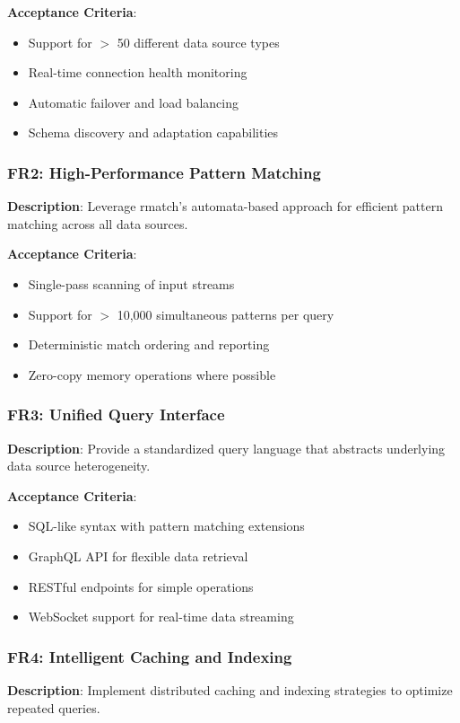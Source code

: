 \documentclass[11pt,a4paper]{article}
\begin{document}
\textbf{Acceptance Criteria}:
\begin{itemize}
\item Support for $>$ 50 different data source types
\item Real-time connection health monitoring
\item Automatic failover and load balancing
\item Schema discovery and adaptation capabilities
\end{itemize}

\subsubsection{FR2: High-Performance Pattern Matching}
\textbf{Description}: Leverage rmatch's automata-based approach for efficient pattern matching across all data sources.

\textbf{Acceptance Criteria}:
\begin{itemize}
\item Single-pass scanning of input streams
\item Support for $>$ 10,000 simultaneous patterns per query
\item Deterministic match ordering and reporting
\item Zero-copy memory operations where possible
\end{itemize}

\subsubsection{FR3: Unified Query Interface}
\textbf{Description}: Provide a standardized query language that abstracts underlying data source heterogeneity.

\textbf{Acceptance Criteria}:
\begin{itemize}
\item SQL-like syntax with pattern matching extensions
\item GraphQL API for flexible data retrieval
\item RESTful endpoints for simple operations
\item WebSocket support for real-time data streaming
\end{itemize}

\subsubsection{FR4: Intelligent Caching and Indexing}
\textbf{Description}: Implement distributed caching and indexing strategies to optimize repeated queries.
\end{document}
